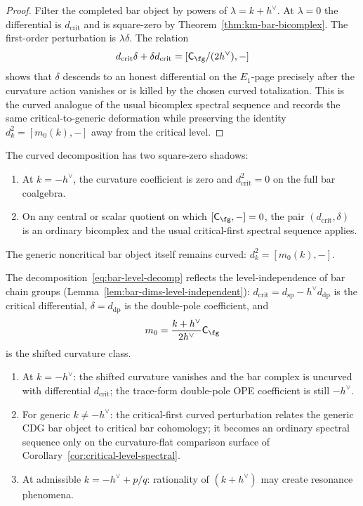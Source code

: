 \begin{proof}
Filter the completed bar object by powers of
\(\lambda=k+h^\vee\).  At \(\lambda=0\) the differential is
\(d_{\mathrm{crit}}\) and is square-zero by
Theorem~\ref{thm:km-bar-bicomplex}.  The first-order perturbation is
\(\lambda\delta\).  The relation
\[
d_{\mathrm{crit}}\delta+\delta d_{\mathrm{crit}}
= [\mathsf C_{\fg}/(2h^\vee),-]
\]
shows that \(\delta\) descends to an honest differential on the
\(E_1\)-page precisely after the curvature action vanishes or is
killed by the chosen curved totalization.  This is the curved analogue
of the usual bicomplex spectral sequence and records the same
critical-to-generic deformation while preserving the identity
\(d_k^2=[m_0(k),-]\) away from the critical level.
\end{proof}

\begin{remark}
\label{rem:km-curved-level-ordinary-faces}
The curved decomposition has two square-zero shadows:
\begin{enumerate}[label=\textup{(\roman*)}]
\item At $k=-h^\vee$, the curvature coefficient is zero and
$d_{\mathrm{crit}}^2=0$ on the full bar coalgebra.
\item On any central or scalar quotient on which
$[\mathsf C_{\fg},-]=0$, the pair
$(d_{\mathrm{crit}},\delta)$ is an ordinary bicomplex and the usual
critical-first spectral sequence applies.
\end{enumerate}
The generic noncritical bar object itself remains curved:
$d_k^2=[m_0(k),-]$.
\end{remark}

\begin{remark}
\label{rem:bicomplex-interpretation}
The decomposition~\eqref{eq:bar-level-decomp} reflects the
level-independence of bar chain groups
(Lemma~\ref{lem:bar-dims-level-independent}):
\(d_{\mathrm{crit}}=d_{\mathrm{sp}}-h^\vee d_{\mathrm{dp}}\) is the
critical differential, \(\delta=d_{\mathrm{dp}}\) is the double-pole
coefficient, and
\[
m_0=\frac{k+h^\vee}{2h^\vee}\mathsf C_{\fg}
\]
is the shifted curvature class.
\begin{enumerate}[label=\textup{(\roman*)}]
\item At $k = -h^\vee$: the shifted curvature vanishes and the bar
complex is uncurved with differential $d_{\mathrm{crit}}$; the
trace-form double-pole OPE coefficient is still $-h^\vee$.
\item For generic $k \neq -h^\vee$: the critical-first curved
perturbation relates the generic CDG bar object to critical bar
cohomology; it becomes an ordinary spectral sequence only on the
curvature-flat comparison surface of
Corollary~\ref{cor:critical-level-spectral}.
\item At admissible $k = -h^\vee + p/q$: rationality of $(k + h^\vee)$ may create resonance phenomena.
\end{enumerate}
\end{remark}

